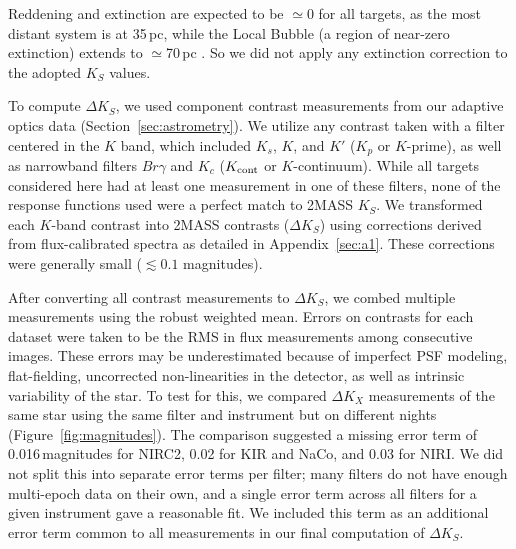\documentclass[twocolumn]{aastex62}
\begin{document}
Reddening and extinction are expected to be $\simeq$0 for all targets, as the most distant system is at 35\,pc, while the Local Bubble (a region of near-zero extinction) extends to $\simeq$70\,pc \citep{2009MNRAS.397.1286A}. So we did not apply any extinction correction to the adopted $K_S$ values.

To compute $\Delta K_S$, we used component contrast measurements from our adaptive optics data (Section~\ref{sec:astrometry}). We utilize any contrast taken with a filter centered in the $K$ band, which included $K_s$, $K$, and $K'$ ($K_p$ or $K$-prime), as well as narrowband filters $Br\gamma$ and $K_c$ ($K_{\rm{cont}}$ or $K$-continuum). While all targets considered here had at least one measurement in one of these filters, none of the response functions used were a perfect match to 2MASS $K_S$. We transformed each $K$-band contrast into 2MASS contrasts ($\Delta K_S$) using corrections derived from flux-calibrated spectra as detailed in Appendix~\ref{sec:a1}. These corrections were generally small ($\lesssim0.1$ magnitudes).

After converting all contrast measurements to $\Delta K_S$, we combed multiple measurements using the robust weighted mean. Errors on contrasts for each dataset were taken to be the RMS in flux measurements among consecutive images. These errors may be underestimated because of imperfect PSF modeling, flat-fielding, uncorrected non-linearities in the detector, as well as intrinsic variability of the star. To test for this, we compared $\Delta K_X$ measurements of the same star using the same filter and instrument but on different nights (Figure~\ref{fig:magnitudes}). The comparison suggested a missing error term of 0.016\,magnitudes for NIRC2, 0.02 for KIR and NaCo, and 0.03 for NIRI. We did not split this into separate error terms per filter; many filters do not have enough multi-epoch data on their own, and a single error term across all filters for a given instrument gave a reasonable fit. We included this term as an additional error term common to all measurements in our final computation of $\Delta K_S$.
\end{document}
